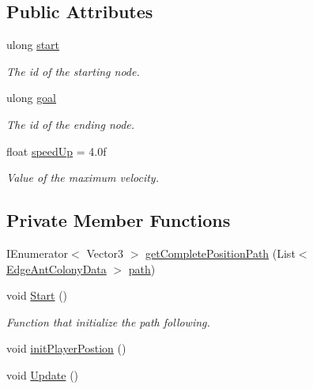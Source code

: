 \subsection*{Public Attributes}
\begin{DoxyCompactItemize}
\item 
ulong \hyperlink{classMoveTo_a1e4eb520af3a9dc0ad9a28a00d6341a8}{start}
\begin{DoxyCompactList}\small\item\em The id of the starting node.\end{DoxyCompactList}\item 
ulong \hyperlink{classMoveTo_a82c0a0458f805d03723a2c4b22fcff04}{goal}
\begin{DoxyCompactList}\small\item\em The id of the ending node.\end{DoxyCompactList}\item 
float \hyperlink{classMoveTo_acbebe9cc77ef109124f5234209b58c45}{speed\+Up} = 4.\+0f
\begin{DoxyCompactList}\small\item\em Value of the maximum velocity.\end{DoxyCompactList}\end{DoxyCompactItemize}
\subsection*{Private Member Functions}
\begin{DoxyCompactItemize}
\item 
I\+Enumerator$<$ Vector3 $>$ \hyperlink{classMoveTo_ab6dcd3455a240e67f54e89db046eedf9}{get\+Complete\+Position\+Path} (List$<$ \hyperlink{classEdgeAntColonyData}{Edge\+Ant\+Colony\+Data} $>$ \hyperlink{classMoveTo_ac005c40e3b3058e444d5099ee11dcb32}{path})
\item 
void \hyperlink{classMoveTo_ae802f560d398f92c7cb15ffb306f4202}{Start} ()
\begin{DoxyCompactList}\small\item\em Function that initialize the path following. \end{DoxyCompactList}\item 
void \hyperlink{classMoveTo_a83efa78b682117fe0f3308d5b24323c6}{init\+Player\+Postion} ()
\item 
void \hyperlink{classMoveTo_a4d754b4bdb8defeaf68c99a3c6b16e9c}{Update} ()
\end{DoxyCompactItemize}
